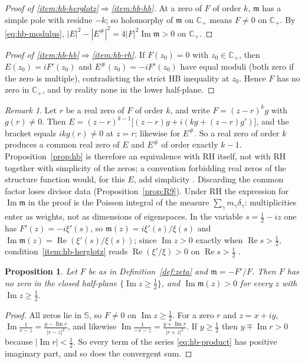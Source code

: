 \documentclass[11pt]{amsart}
\theoremstyle{plain}
\newtheorem{proposition}[theorem]{Proposition}
\theoremstyle{definition}
\theoremstyle{remark}
\newtheorem{remark}[theorem]{Remark}
\numberwithin{equation}{section}
\newcommand{\Cp}{\mathbb{C}_{+}}
\DeclareMathOperator{\Ima}{Im}
\DeclareMathOperator{\Rea}{Re}
\renewcommand{\Re}{\Rea}
\renewcommand{\Im}{\Ima}
\begin{document}
\begin{proof}[Proof of
\ref{item:hb-herglotz}$\Rightarrow$\ref{item:hb-hb}]
At a zero of $F$ of order $k$, $\mathfrak m$ has a simple pole with
residue $-k$; so holomorphy of $\mathfrak m$ on $\Cp$ means $F\ne0$ on
$\Cp$. By \eqref{eq:hb-modulus}, $|E|^2-|E^\#|^2=4|F|^2\Im\mathfrak m>0$
on $\Cp$.
\end{proof}

\begin{proof}[Proof of \ref{item:hb-hb}$\Rightarrow$\ref{item:hb-rh}]
If $F(z_0)=0$ with $z_0\in\Cp$, then $E(z_0)=iF'(z_0)$ and
$E^\#(z_0)=-iF'(z_0)$ have equal moduli (both zero if the zero is
multiple), contradicting the strict HB inequality at $z_0$. Hence $F$
has no zero in $\Cp$, and by reality none in the lower half-plane.
\end{proof}

\begin{remark}\label{rem:hb}
Let $r$ be a real zero of $F$ of order $k$, and write
$F=(z-r)^kg$ with $g(r)\ne0$. Then
$E=(z-r)^{k-1}\bigl[(z-r)g+i(kg+(z-r)g')\bigr]$, and the bracket
equals $ikg(r)\ne0$ at $z=r$; likewise for $E^\#$. So a real zero of
order $k$ produces a common real zero of $E$ and $E^\#$ of order exactly
$k-1$. Proposition~\ref{prop:hb} is therefore an equivalence with RH
itself, not with RH together with simplicity of the zeros; a convention
forbidding real zeros of the structure function would, for this $E$,
add simplicity \cite[\S1]{Lagarias2006HilbertEntire}. Discarding the
common factor loses divisor data (Proposition~\ref{prop:R9}). Under RH
the expression for $\Im\mathfrak m$ in the proof is the Poisson
integral of the
measure $\sum_\gamma m_\gamma\delta_\gamma$: multiplicities enter as
weights, not as dimensions of eigenspaces. In the variable
$s=\tfrac12-iz$ one has $F'(z)=-i\xi'(s)$, so
$\mathfrak m(z)=i\xi'(s)/\xi(s)$ and
$\Im\mathfrak m(z)=\Re(\xi'(s)/\xi(s))$; since $\Im z>0$ exactly when
$\Re s>\tfrac12$, condition~\ref{item:hb-herglotz} reads
$\Re(\xi'/\xi)>0$ on $\Re s>\tfrac12$
\cite[(10), p.~9]{Lagarias2006HilbertEntire}.
\end{remark}

\begin{proposition}\label{prop:hb-high}
Let $F$ be as in Definition~\ref{def:zeta} and $\mathfrak m=-F'/F$.
Then $F$ has no zero in the closed half-plane $\{\Im z\ge\tfrac12\}$,
and $\Im\mathfrak m(z)>0$ for every $z$ with $\Im z\ge\tfrac12$.
\end{proposition}

\begin{proof}
All zeros lie in $\mathbb S$, so $F\ne0$ on $\Im z\ge\tfrac12$. For a zero $r$
and $z=x+iy$,
$\Im\frac1{r-z}=\frac{y-\Im r}{|r-z|^2}$, and likewise
$\Im\frac1{-r-z}=\frac{y+\Im r}{|r+z|^2}$. If $y\ge\tfrac12$ then
$y\mp\Im r>0$ because $|\Im r|<\tfrac12$. So every term of the series
\eqref{eq:hb-product} has positive imaginary part, and so does the
convergent sum.
\end{proof}
\end{document}
